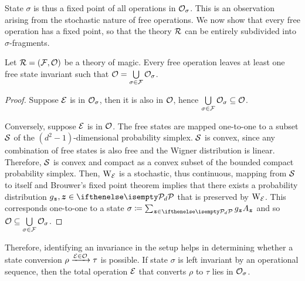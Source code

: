 State $\sigma$ is thus a fixed point of all operations in $\O_\sigma$. 
This is an observation arising from the stochastic nature of free operations. 
We now show that every free operation has a fixed point, so that the theory $\R$ can be entirely subdivided into $\sigma$-fragments.

\begin{theorem}
    Let $\R = (\F, \O)$ be a theory of magic.
    Every free operation leaves at least one free state invariant such that $\O = \bigcup\limits_{\sigma \in \F} \O_\sigma$.
\end{theorem}
\begin{proof}
    Suppose $\E$ is in $\O_\sigma$, then it is also in $\O$, hence $\bigcup\limits_{\sigma \in \F} \O_\sigma \subseteq \O$.
    
    Conversely, suppose $\E$ is in $\O$. 
    The free states are mapped one-to-one to a subset $\cal{S}$ of the $(d^2 - 1)$-dimensional probability simplex.
    $\cal{S}$ is convex, since any combination of free states is also free and the Wigner distribution is linear.
    Therefore, $\cal{S}$ is convex and compact as a convex subset of the bounded compact probability simplex. 
    Then, $\W{\E}{}$ is a stochastic, thus continuous, mapping from $\cal{S}$ to itself and Brouwer's fixed point theorem  implies that there exists a probability distribution $g_{\bmz}, \bmz \in \pd$ that is preserved by $\W{\E}{}$.
    This corresponds one-to-one to a state $\sigma \coloneqq \sum_{\bmz \in \pd} g_{\bmz} A_{\bmz}$ and so $\O \subseteq \bigcup\limits_{\sigma \in \F} \O_\sigma$.
\end{proof}
Therefore, identifying an invariance in the setup helps in determining whether a state conversion $\rho \xrightarrow{\E \in \O} \tau$ is possible. 
If state $\sigma$ is left invariant by an operational sequence, then the total operation $\E$ that converts $\rho$ to $\tau$ lies in $\O_\sigma$. 

